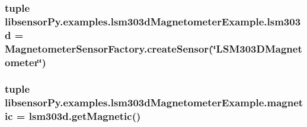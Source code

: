 \subsubsection[{lsm303d}]{\setlength{\rightskip}{0pt plus 5cm}tuple libsensor\+Py.\+examples.\+lsm303d\+Magnetometer\+Example.\+lsm303d = {\bf Magnetometer\+Sensor\+Factory.\+create\+Sensor}(\char`\"{}L\+S\+M303\+D\+Magnetometer\char`\"{})}\label{namespacelibsensorPy_1_1examples_1_1lsm303dMagnetometerExample_aaeb5f8cfe647970c1f475fec5671ed77}
\hypertarget{namespacelibsensorPy_1_1examples_1_1lsm303dMagnetometerExample_a5baf3c52bfcab1106699e95fd1096e30}{}
\subsubsection[{magnetic}]{\setlength{\rightskip}{0pt plus 5cm}tuple libsensor\+Py.\+examples.\+lsm303d\+Magnetometer\+Example.\+magnetic = lsm303d.\+get\+Magnetic()}\label{namespacelibsensorPy_1_1examples_1_1lsm303dMagnetometerExample_a5baf3c52bfcab1106699e95fd1096e30}
